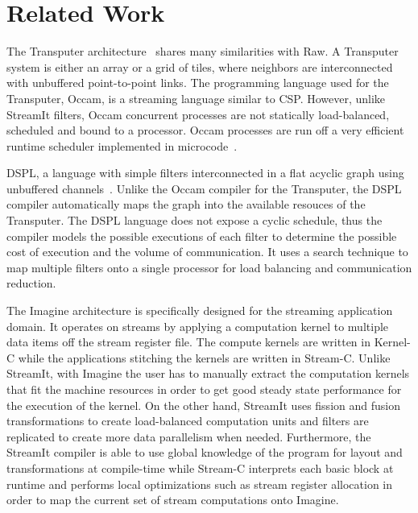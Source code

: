 \section{Related Work}
\label{sec:related}

The Transputer architecture~\cite{transputer88} shares many
similarities with Raw.  A Transputer system is either an array or a
grid of tiles, where neighbors are interconnected with unbuffered
point-to-point links. The programming language used for the
Transputer, Occam, is a streaming language similar to CSP.  However,
unlike StreamIt filters, Occam concurrent processes are not statically
load-balanced, scheduled and bound to a processor. Occam processes are
run off a very efficient runtime scheduler implemented in
microcode~\cite{may87communicating}.

DSPL, a language with simple filters interconnected in a flat acyclic
graph using unbuffered channels~\cite{Thiel93}.  Unlike the Occam
compiler for the Transputer, the DSPL compiler automatically maps the
graph into the available resouces of the Transputer. The DSPL language
does not expose a cyclic schedule, thus the compiler models the
possible executions of each filter to determine the possible cost of
execution and the volume of communication. It uses a search technique
to map multiple filters onto a single processor for load balancing and
communication reduction. 


The Imagine architecture is specifically designed for the streaming
application domain.  It operates on streams by applying a computation
kernel to multiple data items off the stream register file.  The
compute kernels are written in Kernel-C while the applications
stitching the kernels are written in Stream-C.  Unlike StreamIt, with
Imagine the user has to manually extract the computation kernels that
fit the machine resources in order to get good steady state
performance for the execution of the kernel.  On the other hand,
StreamIt uses fission and fusion transformations to create
load-balanced computation units and filters are replicated to create
more data parallelism when needed.  Furthermore, the StreamIt compiler
is able to use global knowledge of the program for layout and
transformations at compile-time while Stream-C interprets each basic
block at runtime and performs local optimizations such as stream
register allocation in order to map the current set of stream
computations onto Imagine.

% 
%
